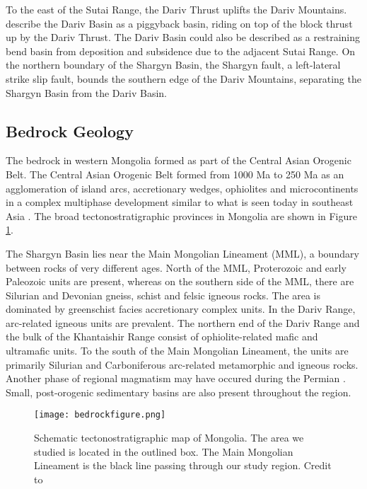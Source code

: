 	To the east of the Sutai Range, the Dariv Thrust uplifts the Dariv Mountains. \citet{Howard2006} describe the Dariv Basin as a piggyback basin, riding on top of the block thrust up by the Dariv Thrust. The Dariv Basin could also be described as a restraining bend basin from deposition and subsidence due to the adjacent Sutai Range. On the northern boundary of the Shargyn Basin, the Shargyn fault, a left-lateral strike slip fault, bounds the southern edge of the Dariv Mountains, separating the Shargyn Basin from the Dariv Basin.

\subsection{Bedrock Geology}
The bedrock in western Mongolia formed as part of the Central Asian Orogenic Belt. The Central Asian Orogenic Belt formed from 1000 Ma to 250 Ma as an agglomeration of island arcs, accretionary wedges, ophiolites and microcontinents in a complex multiphase development similar to what is seen today in southeast Asia \citep{Windley2007}. The broad tectonostratigraphic provinces in Mongolia are shown in Figure \ref{bedrock}.

The Shargyn Basin lies near the Main Mongolian Lineament (MML), a boundary between rocks of very different ages. North of the MML, Proterozoic and early Paleozoic units are present, whereas on the southern side of the MML, there are Silurian and Devonian gneiss, schist and felsic igneous rocks. The area is dominated by greenschist facies accretionary complex units. In the Dariv Range, arc-related igneous units are prevalent. The northern end of the Dariv Range and the bulk of the Khantaishir Range consist of ophiolite-related mafic and ultramafic units. To the south of the Main Mongolian Lineament, the units are primarily Silurian and Carboniferous arc-related metamorphic and igneous rocks. Another phase of regional magmatism may have occured during the Permian \citep{Windley2007}. Small, post-orogenic sedimentary basins are also present throughout the region.

\begin{figure}[h!]
  \centering
  \texttt{[image: bedrockfigure.png]}
  \caption{Schematic tectonostratigraphic map of Mongolia. The area we studied is located in the outlined box. The Main Mongolian Lineament is the black line passing through our study region. Credit to \citet{Windley2007}}
  \label{bedrock}
\end{figure}

